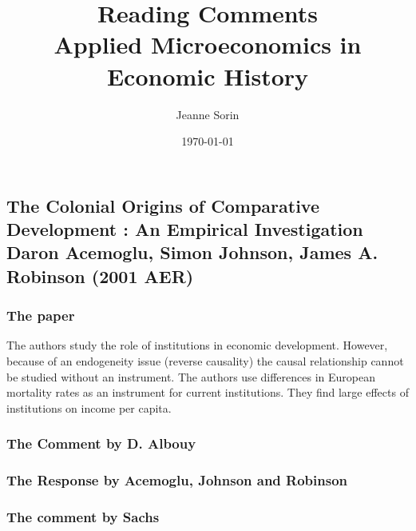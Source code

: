 \documentclass[12pt, final]{article}
\title{Reading Comments \\ Applied Microeconomics in Economic History}
\author{Jeanne Sorin}
\date{\today}
\begin{document}
\maketitle

\subsection*{The Colonial Origins of Comparative Development : An Empirical Investigation \\ Daron Acemoglu, Simon Johnson, James A. Robinson (2001 AER)} %
\label{subsec:the_colonial_origins_of_comparative_development_an_empirical_investigation_\_daron_acemoglu_simon_johnson_james_a_robinson_}

\subsubsection*{The paper} %
\label{ssub:the_paper}

The authors study the role of institutions in economic development. However, because of an endogeneity issue (reverse causality) the causal relationship cannot be studied without an instrument. The authors use differences in European mortality rates as an instrument for current institutions. They find large effects of institutions on income per capita.



\subsubsection*{The Comment by D. Albouy} %
\label{ssub:the_comment_by_d_albouy}



\subsubsection*{The Response by Acemoglu, Johnson and Robinson} %
\label{ssub:the_response_by_acemoglu_johnson_and_robinson}


\subsubsection*{The comment by Sachs} %
\label{ssub:the_comment_by_sachs}



\end{document}
